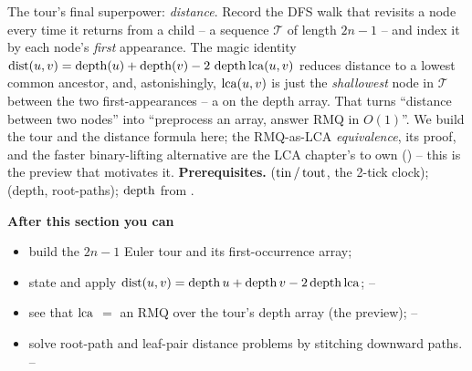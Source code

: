 \begin{topicintro}
The tour's final superpower: \emph{distance}. Record the DFS walk that revisits a node every
time it returns from a child -- a sequence $\mathcal{T}$ of length $2n-1$ -- and index it by
each node's \emph{first} appearance. The magic identity
$\operatorname{dist}(u,v) = \operatorname{depth}(u) + \operatorname{depth}(v) - 2\,\operatorname{depth}{\operatorname{lca}(u,v)}$ reduces distance to a lowest
common ancestor, and, astonishingly, $\operatorname{lca}(u,v)$ is just the \emph{shallowest} node in
$\mathcal{T}$ between the two first-appearances -- a  on the depth
array. That turns ``distance between two nodes'' into ``preprocess an array, answer RMQ in
$O(1)$''. We build the tour and the distance formula here; the RMQ-as-LCA \emph{equivalence},
its proof, and the faster binary-lifting alternative are the LCA chapter's to own
() -- this is the preview that motivates it.
\textbf{Prerequisites.}  ($\operatorname{tin}/\operatorname{tout}$, the 2-tick clock);
 (depth, root-paths); $\operatorname{depth}$ from .

\textbf{After this section you can}
\begin{itemize}[nosep]
  \item build the $2n{-}1$ Euler tour and its first-occurrence array;      \hfill{}
  \item state and apply $\operatorname{dist}(u,v)=\operatorname{depth} u+\operatorname{depth} v-2\operatorname{depth}{\operatorname{lca}}$;          \hfill{}--
  \item see that $\operatorname{lca}$ $=$ an RMQ over the tour's depth array (the preview);   \hfill{}--
  \item solve root-path and leaf-pair distance problems by stitching downward paths. \hfill{}--
\end{itemize}
\end{topicintro}

